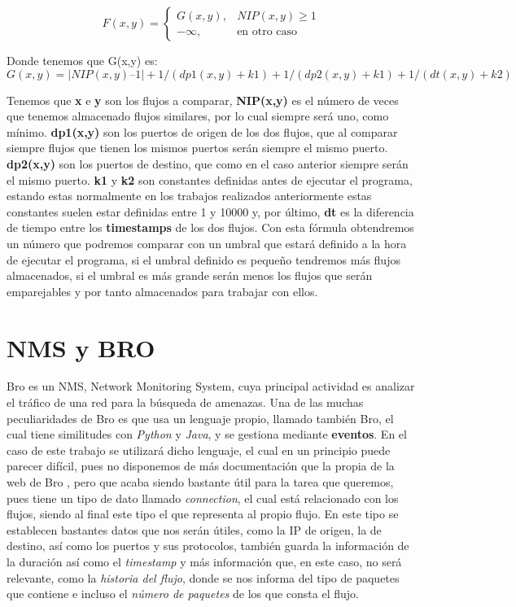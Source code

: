 \begin{equation*}
	F(x,y)=
 	\begin{cases}
	  G(x,y), & NIP(x,y) \geq 1 \\
	  -\infty, & \text{en otro caso}
	 \end{cases}
\end{equation*}

\noindent Donde tenemos que G(x,y) es:
\intro
\begin{displaymath}
G(x,y) = |NIP(x,y) – 1| + 1 / (dp1(x,y) + k1) + 1 / (dp2(x,y) + k1) + 1 / (dt(x,y) + k2)
\end{displaymath}

\noindent Tenemos que \textbf{x} e \textbf{y} son los flujos a comparar, \textbf{NIP(x,y)} es el número 
de veces que tenemos almacenado flujos similares, por lo cual siempre 
será uno, como mínimo. \textbf{dp1(x,y)} son los puertos de origen de los dos 
flujos, que al comparar siempre flujos que tienen los mismos puertos serán siempre el mismo puerto.
\textbf{dp2(x,y)} son los puertos de destino, que como en el caso anterior siempre serán el mismo puerto.
\textbf{k1} y \textbf{k2} son constantes definidas antes de ejecutar el programa, 
estando estas normalmente en los trabajos realizados anteriormente estas constantes suelen estar 
definidas entre 1 y 10000 y, por último, \textbf{dt} es la diferencia de tiempo entre 
los \textbf{timestamps} de los dos flujos.
\intro
Con esta fórmula obtendremos un número que podremos comparar con un 
umbral que estará definido a la hora de ejecutar el programa, si el umbral 
definido es pequeño tendremos más flujos almacenados, si el umbral es más grande serán 
menos los flujos que serán emparejables y por tanto almacenados para trabajar con ellos. \cite{comparacion}




\section{NMS y BRO}

Bro es un NMS, Network Monitoring System, cuya principal actividad 
es analizar el tráfico de una red para la búsqueda de amenazas. Una de 
las muchas peculiaridades de Bro es que usa un lenguaje propio, llamado 
también Bro, el cual tiene similitudes con \textit{Python} y \textit{Java}, y se gestiona 
mediante \textbf{eventos}. En el caso de este trabajo se utilizará dicho lenguaje, 
el cual en un principio puede parecer difícil, pues no disponemos de más 
documentación que la propia de la web de Bro \cite{broindex}, pero que acaba siendo 
bastante útil para la tarea que queremos, pues tiene un tipo de dato 
llamado \textit{connection}, el cual está relacionado con los flujos, siendo al 
final este tipo el que representa al propio flujo. En este tipo se establecen bastantes 
datos que nos serán útiles, como la IP de origen, la de destino, así 
como los puertos y sus protocolos, también guarda la información de la 
duración así como el \textit{timestamp} y más información que, en este caso, no 
será relevante, como la \textit{historia del flujo}, donde se nos informa del 
tipo de paquetes que contiene e incluso el \textit{número de paquetes} de los que consta el flujo.
\intro


